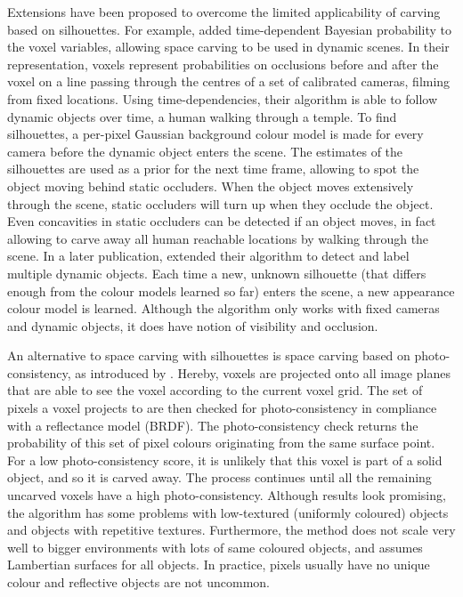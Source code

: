 Extensions have been proposed to overcome the limited applicability of carving based on silhouettes. For example, \GuanOld added time-dependent Bayesian probability to the voxel variables, allowing space carving to be used in dynamic scenes. In their representation, voxels represent probabilities on occlusions before and after the voxel on a line passing through the centres of a set of calibrated cameras, filming from fixed locations. Using time-dependencies, their algorithm is able to follow dynamic objects over time, \eg a human walking through a temple. To find silhouettes, a per-pixel Gaussian background colour model is made for every camera before the dynamic object enters the scene. The estimates of the silhouettes are used as a prior for the next time frame, allowing to spot the object moving behind static occluders. When the object moves extensively through the scene, static occluders will turn up when they occlude the object. Even concavities in static occluders can be detected if an object moves, in fact allowing to carve away all human reachable locations by walking through the scene. In a later publication,  extended their algorithm to detect and label multiple dynamic objects. Each time a new, unknown silhouette (that differs enough from the colour models learned so far) enters the scene, a new appearance colour model is learned. Although the algorithm only works with fixed cameras and dynamic objects, it does have notion of visibility and occlusion.

An alternative to space carving with silhouettes is space carving based on photo-consistency, as introduced by \SeitzOld. Hereby, voxels are projected onto all image planes that are able to see the voxel according to the current voxel grid. The set of pixels a voxel projects to are then checked for photo-consistency in compliance with a reflectance model (BRDF). The photo-consistency check returns the probability of this set of pixel colours originating from the same surface point. For a low photo-consistency score, it is unlikely that this voxel is part of a solid object, and so it is carved away. The process continues until all the remaining uncarved voxels have a high photo-consistency. Although results look promising, the algorithm has some problems with low-textured (\ie uniformly coloured) objects and objects with repetitive textures. Furthermore, the method does not scale very well to bigger environments with lots of same coloured objects, and assumes Lambertian surfaces for all objects. In practice, pixels usually have no unique colour and reflective objects are not uncommon.

